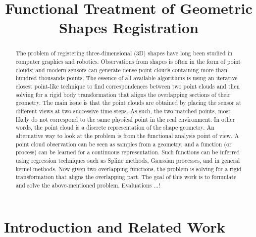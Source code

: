 \documentclass[conference]{IEEEtran}
\begin{document}
\title{Functional Treatment of Geometric Shapes Registration}

\author{}

\maketitle

\begin{abstract}

The problem of registering three-dimensional (3D) shapes have long been studied in computer graphics and robotics. Observations from shapes is often in the form of point clouds; and modern sensors can generate dense point clouds containing more than hundred thousands points. The essence of all available algorithms is using an iterative closest point-like technique to find correspondences between two point clouds and then solving for a rigid body transformation that aligns the overlapping sections of their geometry. The main issue is that the point clouds are obtained by placing the sensor at different views at two successive time-steps. As such, the two matched points, most likely do not correspond to the same physical point in the real environment. In other words, the point cloud is a discrete representation of the shape geometry. An alternative way to look at the problem is from the functional analysis point of view. A point cloud observation can be seen as samples from a geometry, and a function (or process) can be learned for a continuous representation. Such functions can be inferred using regression techniques such as Spline methods, Gaussian processes, and in general kernel methods. Now given two overlapping functions, the problem is solving for a rigid transformation that aligns the overlapping part. The goal of this work is to formulate and solve the above-mentioned problem. Evaluations ...!

\end{abstract}

\IEEEpeerreviewmaketitle

\section{Introduction and Related Work}
\end{document}
